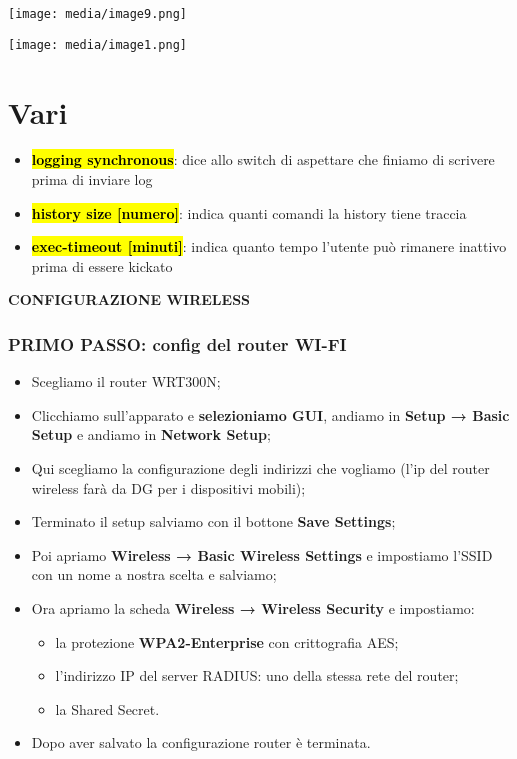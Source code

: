 \texttt{[image: media/image9.png]}

\texttt{[image: media/image1.png]}

\section{Vari}\label{vari}

\begin{itemize}
\item
  \textbf{\hl{logging synchronous}}: dice allo switch di aspettare che
  finiamo di scrivere prima di inviare log
\item
  \textbf{\hl{history size {[}numero{]}}}: indica quanti comandi la
  history tiene traccia
\item
  \textbf{\hl{exec-timeout {[}minuti{]}}}: indica quanto tempo l'utente
  può rimanere inattivo prima di essere kickato
\end{itemize}

\textbf{CONFIGURAZIONE WIRELESS}

\subsubsection{\texorpdfstring{\textbf{PRIMO PASSO: config del router
WI-FI}}{PRIMO PASSO: config del router WI-FI}}\label{primo-passo-config-del-router-wi-fi}

\begin{itemize}
\item
  Scegliamo il router WRT300N;
\item
  Clicchiamo sull'apparato e \textbf{selezioniamo GUI}, andiamo in
  \textbf{Setup → Basic Setup} e andiamo in \textbf{Network Setup};
\item
  Qui scegliamo la configurazione degli indirizzi che vogliamo (l'ip del
  router wireless farà da DG per i dispositivi mobili);
\item
  Terminato il setup salviamo con il bottone \textbf{Save Settings};
\item
  Poi apriamo \textbf{Wireless → Basic Wireless Settings} e impostiamo
  l'SSID con un nome a nostra scelta e salviamo;
\item
  Ora apriamo la scheda \textbf{Wireless → Wireless Security} e
  impostiamo:

  \begin{itemize}
  \item
    la protezione \textbf{WPA2-Enterprise} con crittografia AES;
  \item
    l'indirizzo IP del server RADIUS: uno della stessa rete del router;
  \item
    la Shared Secret.
  \end{itemize}
\item
  Dopo aver salvato la configurazione router è terminata.
\end{itemize}

